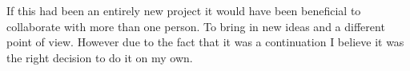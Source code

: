 

If this had been an entirely new project it would have been beneficial to collaborate with more than one person. To bring in new ideas and a different point of view. However due to the fact that it was a continuation I believe it was the right decision to do it on my own.  